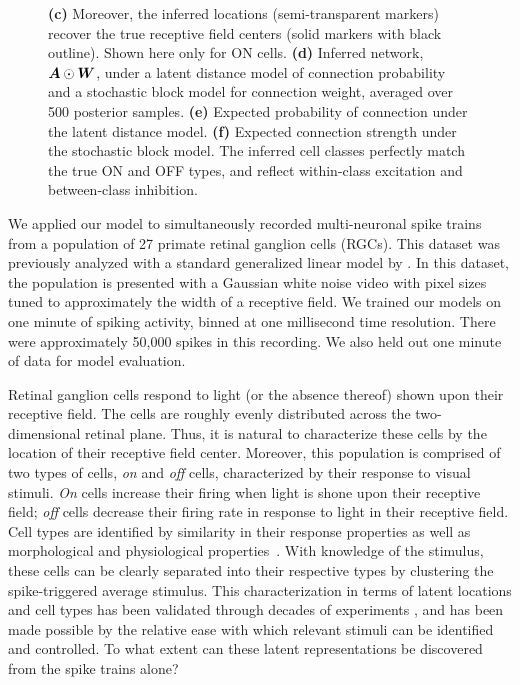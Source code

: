 \begin{figure}[t!]
{    \textbf{(c)} Moreover, the inferred locations (semi-transparent markers) recover the true receptive field centers (solid markers with black outline). Shown here only for ON cells.
    \textbf{(d)} Inferred network,~${\boldsymbol{A} \odot \boldsymbol{W}}$, under a latent distance model of connection probability and a stochastic block model for connection weight, averaged over 500 posterior samples.
    \textbf{(e)} Expected probability of connection under the latent distance model.
    \textbf{(f)} Expected connection strength under the stochastic block model. The inferred cell classes perfectly match the true ON and OFF types, and reflect within-class excitation and between-class inhibition.
}
  \label{fig:rgc}
\end{figure}

We applied our model to simultaneously recorded multi-neuronal spike
trains from a population of 27 primate retinal ganglion cells
(RGCs). This dataset was previously analyzed with a standard
generalized linear model by \citet{Pillow-2008}.  In this dataset, the
population is presented with a Gaussian white noise video with pixel
sizes tuned to approximately the width of a receptive field. We
trained our models on one minute of spiking activity, binned at one
millisecond time resolution. There were approximately 50,000 spikes in
this recording.  We also held out one minute of data for model
evaluation.

Retinal ganglion cells respond to light (or the absence thereof) shown
upon their receptive field. The cells are roughly evenly distributed
across the two-dimensional retinal plane. Thus, it is natural to
characterize these cells by the location of their receptive field
center.  Moreover, this population is comprised of two types of cells,
\textit{on} and \textit{off} cells, characterized by their response to
visual stimuli. \textit{On} cells increase their firing when light is
shone upon their receptive field; \textit{off} cells decrease their
firing rate in response to light in their receptive field.  Cell types
are identified by similarity in their response properties as well as
morphological and physiological
properties~\citep{sanes2015types}. With knowledge of the stimulus,
these cells can be clearly separated into their respective types by
clustering the spike-triggered average stimulus.  This
characterization in terms of latent locations and cell types has been
validated through decades of experiments \citep{kuffler1953discharge},
and has been made possible by the relative ease with which relevant
stimuli can be identified and controlled. To what extent can these
latent representations be discovered from the spike trains alone?

